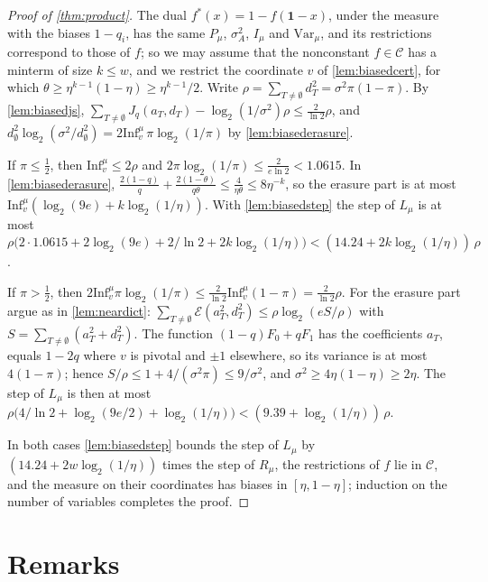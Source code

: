 \documentclass[11pt]{amsart}
\theoremstyle{remark}
\newcommand{\Inf}{\mathrm{Inf}}
\newcommand{\Var}{\mathrm{Var}}
\begin{document}
\begin{proof}[Proof of \cref{thm:product}]
The dual $f^*(x)=1-f(\mathbf 1-x)$, under the measure with the biases $1-q_i$, has the same $P_\mu$, $\sigma_A^2$, $I_\mu$
and $\Var_\mu$, and its restrictions correspond to those of $f$; so we may assume that the nonconstant $f\in\mathcal C$
has a minterm of size $k\le w$, and we restrict the coordinate $v$ of \cref{lem:biasedcert}, for which
$\theta\ge\eta^{k-1}(1-\eta)\ge\eta^{k-1}/2$. Write $\rho=\sum_{T\neq\emptyset}d_T^2=\sigma^2\pi(1-\pi)$. By
\cref{lem:biasedjs}, $\sum_{T\neq\emptyset}J_q(a_T,d_T)-\log_2(1/\sigma^2)\rho\le\frac2{\ln2}\rho$, and
$d_\emptyset^2\log_2(\sigma^2/d_\emptyset^2)=2\Inf^\mu_v\,\pi\log_2(1/\pi)$ by \cref{lem:biasederasure}.

If $\pi\le\frac12$, then $\Inf^\mu_v\le2\rho$ and $2\pi\log_2(1/\pi)\le\frac2{e\ln2}<1.0615$. In \cref{lem:biasederasure},
$\frac{2(1-q)}q+\frac{2(1-\theta)}{q\theta}\le\frac4{\eta\theta}\le8\eta^{-k}$, so the erasure part is at most
$\Inf^\mu_v(\log_2(9e)+k\log_2(1/\eta))$. With \cref{lem:biasedstep} the step of $L_\mu$ is at most
$\rho\bigl(2\cdot1.0615+2\log_2(9e)+2/\ln2+2k\log_2(1/\eta)\bigr)<(14.24+2k\log_2(1/\eta))\,\rho$.

If $\pi>\frac12$, then $2\Inf^\mu_v\pi\log_2(1/\pi)\le\frac2{\ln2}\Inf^\mu_v(1-\pi)=\frac2{\ln2}\rho$. For the erasure part
argue as in \cref{lem:neardict}: $\sum_{T\neq\emptyset}\mathcal E(a_T^2,d_T^2)\le\rho\log_2(eS/\rho)$ with
$S=\sum_{T\neq\emptyset}(a_T^2+d_T^2)$. The function $(1-q)F_0+qF_1$ has the coefficients $a_T$, equals $1-2q$ where $v$ is
pivotal and $\pm1$ elsewhere, so its variance is at most $4(1-\pi)$; hence $S/\rho\le1+4/(\sigma^2\pi)\le9/\sigma^2$, and
$\sigma^2\ge4\eta(1-\eta)\ge2\eta$. The step of $L_\mu$ is then at most
$\rho\bigl(4/\ln2+\log_2(9e/2)+\log_2(1/\eta)\bigr)<(9.39+\log_2(1/\eta))\,\rho$.

In both cases \cref{lem:biasedstep} bounds the step of $L_\mu$ by $(14.24+2w\log_2(1/\eta))$ times the step of $R_\mu$,
the restrictions of $f$ lie in $\mathcal C$, and the measure on their coordinates has biases in $[\eta,1-\eta]$; induction
on the number of variables completes the proof.
\end{proof}

\section{Remarks}\label{sec:remarks}
\end{document}
